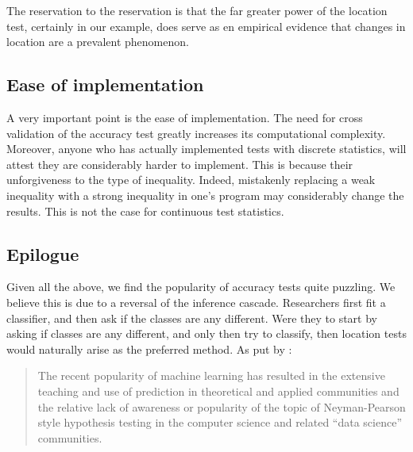 \documentclass[12pt,a4paper]{article}
\begin{document}
The reservation to the reservation is that the far greater power of the location test, certainly in our example, does serve as en empirical evidence that changes in location are a prevalent phenomenon. 




\subsection{Ease of implementation}
A very important point is the ease of implementation. 
The need for cross validation of the accuracy test greatly increases its computational complexity. 
Moreover, anyone who has actually implemented tests with discrete statistics, will attest they are considerably harder to implement. This is because their unforgiveness to the type of inequality. 
Indeed, mistakenly replacing a weak inequality with a strong inequality in one's program may considerably change the results. 
This is not the case for continuous test statistics. 



\subsection{Epilogue}
Given all the above, we find the popularity of accuracy tests quite puzzling. 
We believe this is due to a reversal of the inference cascade. 
Researchers first fit a classifier, and then ask if the classes are any different.
Were they to start by asking if classes are any different, and only then try to classify, then location tests would naturally arise as the preferred method. 
As put by \cite{ramdas_classification_2016}:
\begin{quote}
The recent popularity of machine learning has resulted in the extensive teaching and use
of prediction in theoretical and applied communities and the relative lack of awareness or
popularity of the topic of Neyman-Pearson style hypothesis testing in the computer science
and related ``data science'' communities.
\end{quote}






\end{document}
